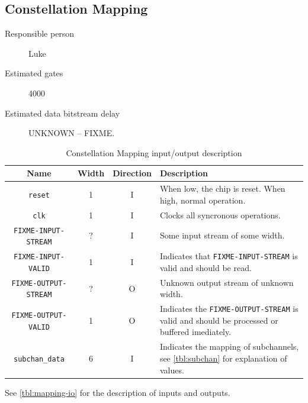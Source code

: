 \documentclass[dvips,10pt,twocolumn]{article}
\newcommand{\wire}{\texttt}
\begin{document}


\subsection{Constellation Mapping}
\label{sec:constellation}
\begin{description}
	\item[Responsible person] Luke
	\item[Estimated gates] 4000
	\item[Estimated data bitstream delay] UNKNOWN -- FIXME.
\end{description}

\begin{table} \begin{tabularx}{\linewidth}{c|c|c|X}
	\label{tbl:mapping-io}
	Name & Width & Direction & Description \\ \hline

	\wire{reset} & 1 & I & When low, the chip is reset. When high, normal
	operation. \\

	\wire{clk}   & 1 & I & Clocks all syncronous operations. \\

	\wire{FIXME-INPUT-STREAM} & ? & I & Some input stream of some width.
	\\

	\wire{FIXME-INPUT-VALID} & 1 & I & Indicates that
	\wire{FIXME-INPUT-STREAM} is valid and should be read. \\

	\wire{FIXME-OUTPUT-STREAM} & ? & O & Unknown output stream of unknown
	width. \\

	\wire{FIXME-OUTPUT-VALID} & 1 & O & Indicates the
	\wire{FIXME-OUTPUT-STREAM} is valid and should be processed or
	buffered imediately. \\

	\wire{subchan\_data} & 6 & I & Indicates the mapping of subchannels, see
	\autoref{tbl:subchan} for explanation of values. \\

\end{tabularx} \caption{Constellation Mapping input/output description}
\end{table}

See \autoref{tbl:mapping-io} for the description of inputs and outputs.
\end{document}
